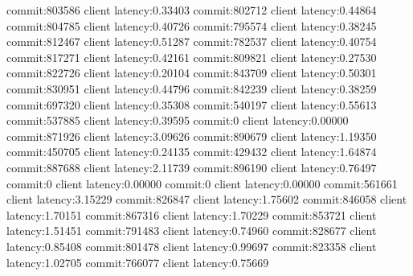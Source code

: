 commit:803586 client latency:0.33403
commit:802712 client latency:0.44864
commit:804785 client latency:0.40726
commit:795574 client latency:0.38245
commit:812467 client latency:0.51287
commit:782537 client latency:0.40754
commit:817271 client latency:0.42161
commit:809821 client latency:0.27530
commit:822726 client latency:0.20104
commit:843709 client latency:0.50301
commit:830951 client latency:0.44796
commit:842239 client latency:0.38259
commit:697320 client latency:0.35308
commit:540197 client latency:0.55613
commit:537885 client latency:0.39595
commit:0 client latency:0.00000
commit:871926 client latency:3.09626
commit:890679 client latency:1.19350
commit:450705 client latency:0.24135
commit:429432 client latency:1.64874
commit:887688 client latency:2.11739
commit:896190 client latency:0.76497
commit:0 client latency:0.00000
commit:0 client latency:0.00000
commit:561661 client latency:3.15229
commit:826847 client latency:1.75602
commit:846058 client latency:1.70151
commit:867316 client latency:1.70229
commit:853721 client latency:1.51451
commit:791483 client latency:0.74960
commit:828677 client latency:0.85408
commit:801478 client latency:0.99697
commit:823358 client latency:1.02705
commit:766077 client latency:0.75669